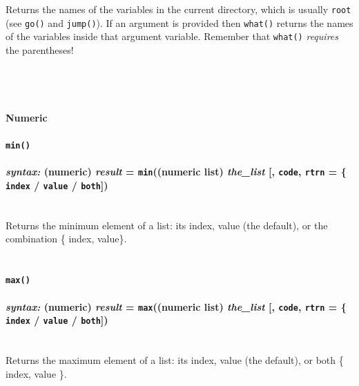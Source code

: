 \documentclass{article}
\begin{document}
Returns the names of the variables in the current directory, which is usually \verb#root# (see \verb#go()# and \verb#jump()#).  If an argument is provided then \verb#what()# returns the names of the variables inside that argument variable.  Remember that \verb#what()# \emph{requires} the parentheses!\\\\\\\\




\paragraph{Numeric}



\paragraph{\texttt{min()}\\\\
\normalfont \emph{syntax: } (numeric) \emph{result} = \texttt{min}((numeric list) \emph{the\_list} [, \texttt{code}, \texttt{rtrn} = \{ \texttt{index} / \texttt{value} / \texttt{both}])\\\\}

Returns the minimum element of a list:  its index, value (the default), or the combination \{ index, value\}.\\\\



\paragraph{\texttt{max()}\\\\
\normalfont \emph{syntax: } (numeric) \emph{result} = \texttt{max}((numeric list) \emph{the\_list} [, \texttt{code}, \texttt{rtrn} = \{ \texttt{index} / \texttt{value} / \texttt{both}])\\\\}

Returns the maximum element of a list:  its index, value (the default), or both \{ index, value \}.\\\\
\end{document}
